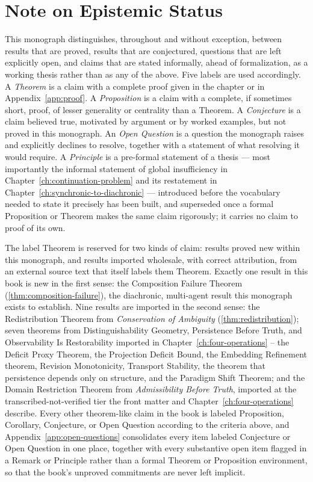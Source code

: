 \chapter*{Note on Epistemic Status}

This monograph distinguishes, throughout and without exception, between
results that are proved, results that are conjectured, questions that
are left explicitly open, and claims that are stated informally, ahead
of formalization, as a working thesis rather than as any of the above.
Five labels are used accordingly. A \emph{Theorem} is a claim with a
complete proof given in the chapter or in Appendix~\ref{app:proof}. A
\emph{Proposition} is a claim with a complete, if sometimes short,
proof, of lesser generality or centrality than a Theorem. A
\emph{Conjecture} is a claim believed true, motivated by argument or by
worked examples, but not proved in this monograph. An \emph{Open
Question} is a question the monograph raises and explicitly declines to
resolve, together with a statement of what resolving it would require.
A \emph{Principle} is a pre-formal statement of a thesis --- most
importantly the informal statement of global insufficiency in
Chapter~\ref{ch:continuation-problem} and its restatement in
Chapter~\ref{ch:synchronic-to-diachronic} --- introduced before the
vocabulary needed to state it precisely has been built, and superseded
once a formal Proposition or Theorem makes the same claim rigorously;
it carries no claim to proof of its own.

The label Theorem is reserved for two kinds of claim: results proved
new within this monograph, and results imported wholesale, with correct
attribution, from an external source text that itself labels them
Theorem. Exactly one result in this book is new in the first sense: the
Composition Failure Theorem (\cref{thm:composition-failure}), the
diachronic, multi-agent result this monograph exists to establish. Nine
results are imported in the second sense: the Redistribution Theorem
from \emph{Conservation of Ambiguity} (\cref{thm:redistribution}); seven
theorems from Distinguishability Geometry, Persistence Before Truth, and
Observability Is Restorability imported in Chapter~\ref{ch:four-operations}
-- the Deficit Proxy Theorem, the Projection Deficit Bound, the Embedding
Refinement theorem, Revision Monotonicity, Transport Stability, the
theorem that persistence depends only on structure, and the Paradigm
Shift Theorem; and the Domain Restriction Theorem from
\emph{Admissibility Before Truth}, imported at the transcribed-not-verified
tier the front matter and Chapter~\ref{ch:four-operations} describe.
Every other theorem-like claim in
the book is labeled Proposition, Corollary, Conjecture, or Open Question
according to the criteria above, and Appendix~\ref{app:open-questions}
consolidates every item labeled Conjecture or Open Question in one
place, together with every substantive open item flagged in a Remark or
Principle rather than a formal Theorem or Proposition environment, so
that the book's unproved commitments are never left implicit.

